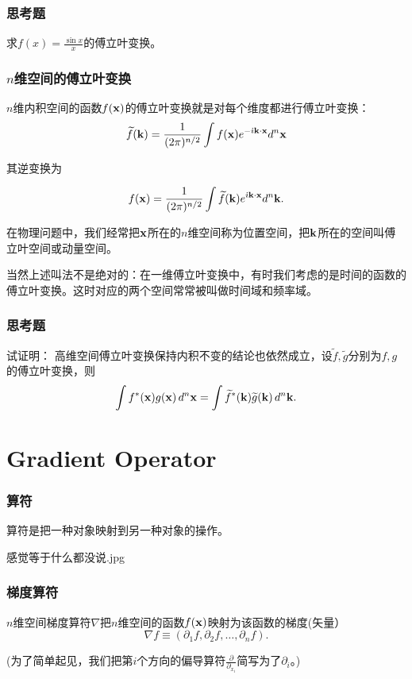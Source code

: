 \documentclass[CJK,13pt]{beamer}
\begin{document}
\begin{frame}
  \frametitle{思考题}
  
  求$f(x) = \frac{\sin x}{x}$的傅立叶变换。
  
\end{frame}


\begin{frame}
  \frametitle{$n$维空间的傅立叶变换}
  
  $n$维内积空间的函数$f({\mathbf{x}})$的傅立叶变换就是对每个维度都进行傅立叶变换：
  $$ \widetilde{f}({\mathbf{k}}) = \frac{1}{(2\pi)^{n/2}}\int f({\mathbf{x}}) e^{-{\dot{\imath}} {\mathbf{k}} \cdot {\mathbf{x}}} d^n{\mathbf{x}} $$

  其逆变换为
  
  $$ f({\mathbf{x}}) = \frac{1}{(2\pi)^{n/2}}\int \widetilde{f}({\mathbf{k}}) e^{{\dot{\imath}} {\mathbf{k}} \cdot {\mathbf{x}}} d^n{\mathbf{k}}. $$

  在物理问题中，我们经常把${\mathbf{x}}$所在的$n$维空间称为位置空间，把${\mathbf{k}}$所在的空间叫傅立叶空间或动量空间。

  {\scriptsize 当然上述叫法不是绝对的：在一维傅立叶变换中，有时我们考虑的是时间的函数的傅立叶变换。这时对应的两个空间常常被叫做时间域和频率域。}
\end{frame}



\begin{frame}
  \frametitle{思考题}
  
  试证明：  高维空间傅立叶变换保持内积不变的结论也依然成立，设$\widetilde{f}, \widetilde{g}$分别为$f,g$的傅立叶变换，则
{\blue  $$\int  f^*({\mathbf{x}})g({\mathbf{x}})\,d^n{\mathbf{x}} = \int \widetilde{f}^*({\mathbf{k}}) \widetilde{g}({\mathbf{k}})\, d^n{\mathbf{k}} . $$}

\end{frame}



\section{Gradient Operator}

\begin{frame}
  \frametitle{算符}
  
      {\blue 算符是把一种对象映射到另一种对象的操作}。


      \bcenter
      
      感觉等于什么都没说.jpg
      \ecenter
      
\end{frame}


\begin{frame}
  \frametitle{梯度算符}
  
  \bex
  $n$维空间梯度算符$\nabla$把$n$维空间的函数$f({\mathbf{x}})$映射为该函数的梯度(矢量）
    $$ \nabla f \equiv (\partial_1 f, \partial_2 f,\ldots, \partial_n f) .$$
    
    (为了简单起见，我们把第$i$个方向的偏导算符$\frac{\partial}{\partial_{x_i}}$简写为了$\partial_i$。)
  \eex

  
\end{frame}
\end{document}
